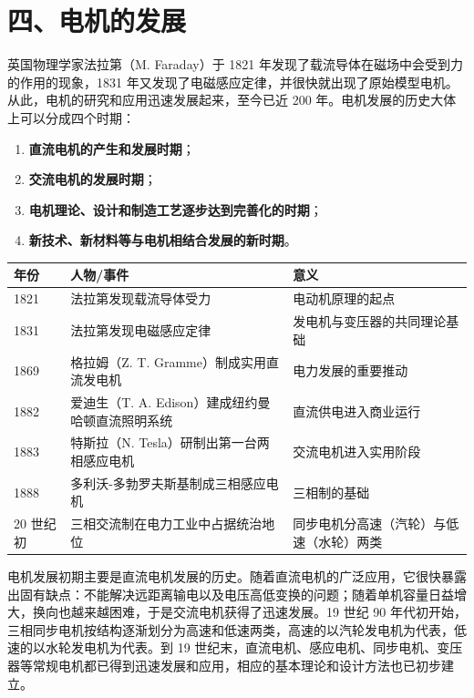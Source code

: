 
\section*{四、电机的发展}

英国物理学家法拉第（M. Faraday）于 1821 年发现了载流导体在磁场中会受到力的作用的现象，1831 年又发现了电磁感应定律，并很快就出现了原始模型电机。从此，电机的研究和应用迅速发展起来，至今已近 200 年。电机发展的历史大体上可以分成四个时期：

\begin{enumerate}
  \item \textbf{直流电机的产生和发展时期}；
  \item \textbf{交流电机的发展时期}；
  \item \textbf{电机理论、设计和制造工艺逐步达到完善化的时期}；
  \item \textbf{新技术、新材料等与电机相结合发展的新时期}。
\end{enumerate}

\begin{center}
\begin{tabular}{@{}llp{8.2cm}@{}}
\toprule
年份 & 人物/事件 & 意义 \\
\midrule
1821 & 法拉第发现载流导体受力 & 电动机原理的起点 \\
1831 & 法拉第发现电磁感应定律 & 发电机与变压器的共同理论基础 \\
1869 & 格拉姆（Z. T. Gramme）制成实用直流发电机 & 电力发展的重要推动 \\
1882 & 爱迪生（T. A. Edison）建成纽约曼哈顿直流照明系统 & 直流供电进入商业运行 \\
1883 & 特斯拉（N. Tesla）研制出第一台两相感应电机 & 交流电机进入实用阶段 \\
1888 & 多利沃-多勃罗夫斯基制成三相感应电机 & 三相制的基础 \\
20 世纪初 & 三相交流制在电力工业中占据统治地位 & 同步电机分高速（汽轮）与低速（水轮）两类 \\
\bottomrule
\end{tabular}
\end{center}

电机发展初期主要是直流电机发展的历史。随着直流电机的广泛应用，它很快暴露出固有缺点：不能解决远距离输电以及电压高低变换的问题；随着单机容量日益增大，换向也越来越困难，于是交流电机获得了迅速发展。19 世纪 90 年代初开始，三相同步电机按结构逐渐划分为高速和低速两类，高速的以汽轮发电机为代表，低速的以水轮发电机为代表。到 19 世纪末，直流电机、感应电机、同步电机、变压器等常规电机都已得到迅速发展和应用，相应的基本理论和设计方法也已初步建立。

